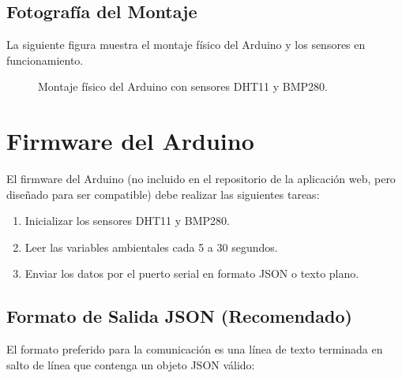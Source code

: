 \documentclass[12pt,a4paper]{report}
\begin{document}
\subsection{Fotografía del Montaje}
\label{subsec:foto-montaje}

La siguiente figura muestra el montaje físico del Arduino y los sensores en funcionamiento.

\begin{figure}[H]
    \centering
    \caption{Montaje físico del Arduino con sensores DHT11 y BMP280.}
    \label{fig:arduino-funcionando}
\end{figure}

\section{Firmware del Arduino}
\label{sec:firmware}

El firmware del Arduino (no incluido en el repositorio de la aplicación web, pero diseñado para ser compatible) debe realizar las siguientes tareas:

\begin{enumerate}[leftmargin=*]
    \item Inicializar los sensores DHT11 y BMP280.
    \item Leer las variables ambientales cada 5 a 30 segundos.
    \item Enviar los datos por el puerto serial en formato JSON o texto plano.
\end{enumerate}

\subsection{Formato de Salida JSON (Recomendado)}
\label{subsec:formato-json}

El formato preferido para la comunicación es una línea de texto terminada en salto de línea que contenga un objeto JSON válido:
\end{document}

